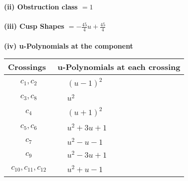 \documentclass[1p]{elsarticle_modified}
\theoremstyle{definition}
\begin{document}
\flushleft \textbf{(ii) Obstruction class $= 1$}\\~\\
\flushleft \textbf{(iii) Cusp Shapes $= -\frac{45}{4} u+\frac{45}{4}$}\\~\\
\newpage\renewcommand{\arraystretch}{1}
\flushleft \textbf{(iv) u-Polynomials at the component}\newline \\
\begin{tabular}{m{50pt}|m{274pt}}
Crossings & \hspace{64pt}u-Polynomials at each crossing \\
\hline $$\begin{aligned}c_{1},c_{2}\end{aligned}$$&$\begin{aligned}
&(u-1)^2
\end{aligned}$\\
\hline $$\begin{aligned}c_{3},c_{8}\end{aligned}$$&$\begin{aligned}
&u^2
\end{aligned}$\\
\hline $$\begin{aligned}c_{4}\end{aligned}$$&$\begin{aligned}
&(u+1)^2
\end{aligned}$\\
\hline $$\begin{aligned}c_{5},c_{6}\end{aligned}$$&$\begin{aligned}
&u^2+3 u+1
\end{aligned}$\\
\hline $$\begin{aligned}c_{7}\end{aligned}$$&$\begin{aligned}
&u^2- u-1
\end{aligned}$\\
\hline $$\begin{aligned}c_{9}\end{aligned}$$&$\begin{aligned}
&u^2-3 u+1
\end{aligned}$\\
\hline $$\begin{aligned}c_{10},c_{11},c_{12}\end{aligned}$$&$\begin{aligned}
&u^2+u-1
\end{aligned}$\\
\hline
\end{tabular}\\~\\
\end{document}
